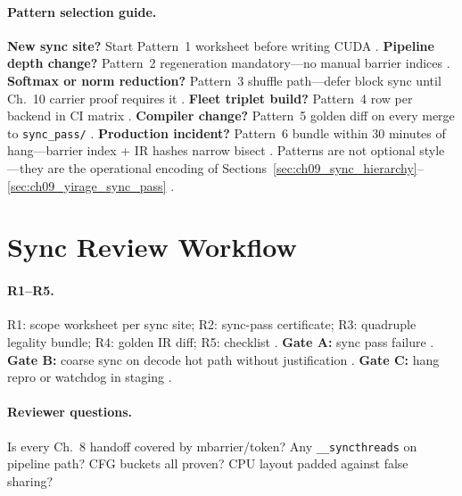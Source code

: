\paragraph{Pattern selection guide.}
\textbf{New sync site?} Start Pattern~1 worksheet before writing CUDA \citep{chen2020compilerbasedhardw,nvidia2022hopper}.
\textbf{Pipeline depth change?} Pattern~2 regeneration mandatory---no manual barrier indices \citep{semianalysis2024tma,yirage2026}.
\textbf{Softmax or norm reduction?} Pattern~3 shuffle path---defer block sync until Ch.~10 carrier proof requires it \citep{dao2022flashattention,shah2024flashattention3}.
\textbf{Fleet triplet build?} Pattern~4 row per backend in CI matrix \citep{amd2024xdna,patel2025llminference,mpk2025}.
\textbf{Compiler change?} Pattern~5 golden diff on every merge to \texttt{sync\_pass/} \citep{wu2024mirage,yirage2026}.
\textbf{Production incident?} Pattern~6 bundle within 30 minutes of hang---barrier index + IR hashes narrow bisect \citep{taxbreak2026,shah2024flashattention3}.
Patterns are not optional style---they are the operational encoding of Sections~\ref{sec:ch09_sync_hierarchy}--\ref{sec:ch09_yirage_sync_pass} \citep{chen2020compilerbasedhardw,mpk2025}.

\section{Sync Review Workflow}
\label{sec:ch09_sync_review}

\paragraph{R1--R5.}
R1: scope worksheet per sync site; R2: sync-pass certificate; R3: quadruple legality bundle; R4: golden IR diff; R5: checklist \citep{yirage2026,chen2020compilerbasedhardw,shah2024flashattention3,wu2024mirage}.
\textbf{Gate A:} sync pass failure \citep{taxbreak2026}.
\textbf{Gate B:} coarse sync on decode hot path without justification \citep{patel2025llminference,memoryfloor2026}.
\textbf{Gate C:} hang repro or watchdog in staging \citep{shah2024flashattention3,mpk2025}.

\paragraph{Reviewer questions.}
Is every Ch.~8 handoff covered by mbarrier/token? \citep{semianalysis2024tma,yirage2026}
Any \texttt{\_\_syncthreads} on pipeline path? \citep{shah2024flashattention3,nvidia2022hopper}
CFG buckets all proven? \citep{nvidia2024cudagraphs,patel2025llminference}
CPU layout padded against false sharing? \citep{dlbook,chen2020compilerbasedhardw}

